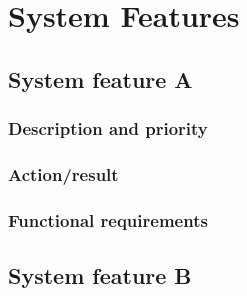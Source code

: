 \documentclass[10pt]{article}
\begin{document}









\section{System Features}

\subsection{System feature A}

\lipsum[10]

\subsubsection{Description and priority}

\lipsum[10]

\subsubsection{Action/result}

\lipsum[10]

\subsubsection{ Functional requirements}

\lipsum[10]








\subsection{System feature B}
\end{document}
